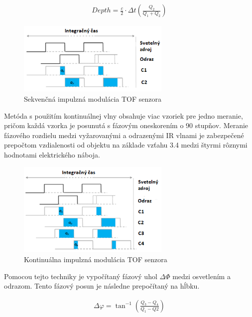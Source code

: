 \begin{equation}
\label{eq3}
\begin{aligned}
Depth=\frac{c}{2}\cdot\Delta t \left( \frac{Q_2}{Q_1 + Q_2}\right) 
\end{aligned}
\end{equation}

\begin{figure}[H]
	\centering
	\includegraphics[width=0.65\textwidth]{figures/tof_principle_a.png} 
	\caption{Sekvenčná impulzná modulácia TOF senzora}
	\label{fig:tof_principle_a}
\end{figure}

Metóda s použitím kontinuálnej vlny obsahuje viac vzoriek pre jedno meranie, pričom každá vzorka je posunutá s fázovým oneskorením o 90 stupňov. Meranie fázového rozdielu medzi vyžarovanými a odrazenými IR vlnami je zabezpečené prepočtom vzdialenosti od objektu na základe vzťahu 3.4 medzi štyrmi rôznymi hodnotami elektrického náboja.

\begin{figure}[H]

	\centering
	\includegraphics[width=0.65\textwidth]{figures/tof_principle_b.png} 
	\caption{Kontinuálna impulzná modulácia TOF senzora}
	\label{fig:tof_principle_b}

\end{figure}

Pomocou tejto techniky je vypočítaný fázový uhol $\Delta \varPhi$ medzi osvetlením a odrazom. Tento fázový posun je následne prepočítaný na hĺbku.

\begin{equation}
\label{eq4}
\begin{aligned}
\Delta \varphi=\tan^{-1} \left( \frac{Q_3 - Q_4}{Q_1-Q2} \right) 
\end{aligned}
\end{equation}

